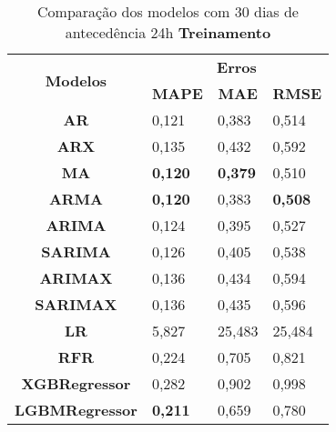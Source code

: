 \begin{table}[H]
	\centering
	\caption{Comparação dos modelos com 30 dias de antecedência 24h \textbf{Treinamento} }\label{tb:60-24trn}
	\begin{tabular}{@{}clll@{}}
		\toprule
		\multirow{2}{*}{\textbf{Modelos}} & \multicolumn{3}{c}{\textbf{Erros}}                                                                       \\ \cmidrule(l){2-4} 
		& \multicolumn{1}{c}{\textbf{MAPE}} & \multicolumn{1}{c}{\textbf{MAE}} & \multicolumn{1}{c}{\textbf{RMSE}} \\ \hline
\textbf{AR}                       & 0,121                             & 0,383                            & 0,514                             \\
\textbf{ARX}                      & 0,135                             & 0,432                            & 0,592                             \\
\textbf{MA}                       & \textbf{0,120}                             & \textbf{0,379 }                           & 0,510                             \\
\textbf{ARMA}                     &\textbf{ 0,120}                             & 0,383                            & \textbf{0,508}                             \\
\textbf{ARIMA}                    & 0,124                             & 0,395                            & 0,527                             \\
\textbf{SARIMA}                   & 0,126                             & 0,405                            & 0,538                             \\
\textbf{ARIMAX}                   & 0,136                             & 0,434                            & 0,594                             \\
\textbf{SARIMAX}                  & 0,136                             & 0,435                            & 0,596                             \\
\textbf{LR}                       & 5,827                             & 25,483                           & 25,484                            \\
\textbf{RFR}                      & 0,224                             & 0,705                            & 0,821                             \\
\textbf{XGBRegressor}             & 0,282                             & 0,902                            & 0,998                             \\
\textbf{LGBMRegressor}            & \textbf{0,211}                             & 0,659                            & 0,780                             \\ \bottomrule
	\end{tabular}

\end{table}

